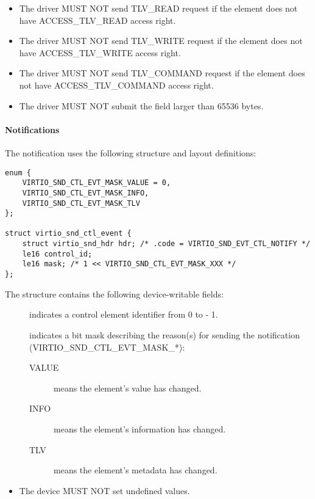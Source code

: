 
\begin{itemize}
\item The driver MUST NOT send TLV_READ request if the element does not have
ACCESS_TLV_READ access right.
\item The driver MUST NOT send TLV_WRITE request if the element does not have
ACCESS_TLV_WRITE access right.
\item The driver MUST NOT send TLV_COMMAND request if the element does not have
ACCESS_TLV_COMMAND access right.
\item The driver MUST NOT submit the  field larger than 65536 bytes. 
\end{itemize}

\paragraph{Notifications}

The notification uses the following structure and layout definitions:

\begin{lstlisting}
enum {
    VIRTIO_SND_CTL_EVT_MASK_VALUE = 0,
    VIRTIO_SND_CTL_EVT_MASK_INFO,
    VIRTIO_SND_CTL_EVT_MASK_TLV
};

struct virtio_snd_ctl_event {
    struct virtio_snd_hdr hdr; /* .code = VIRTIO_SND_EVT_CTL_NOTIFY */
    le16 control_id;
    le16 mask; /* 1 << VIRTIO_SND_CTL_EVT_MASK_XXX */
};
\end{lstlisting}

The structure contains the following device-writable fields:

\begin{description}
\item[] indicates a control element identifier from 0 to
 - 1.
\item[] indicates a bit mask describing the reason(s) for sending
the notification (VIRTIO_SND_CTL_EVT_MASK_*):
\begin{description}
\item[VALUE] means the element's value has changed.
\item[INFO] means the element's information has changed.
\item[TLV] means the element's metadata has changed.
\end{description}
\end{description}


\begin{itemize}
\item The device MUST NOT set undefined  values.
\end{itemize}
